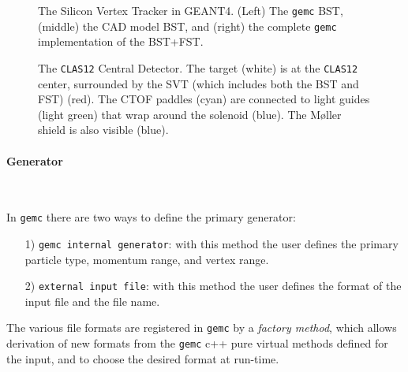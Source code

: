 \begin{figure}[h]
\begin{center}
\caption{\small{The Silicon Vertex Tracker in GEANT4. (Left) The 
{\tt gemc} BST, (middle) the CAD model BST, and (right) the complete 
{\tt gemc} implementation of the BST+FST.}}
\label{fig:svt}
\end{center}
\end{figure}
\clearpage
\newpage

\begin{figure}[h]
\begin{center}
\caption{\small{The {\tt CLAS12} Central Detector. The target (white) is at 
the {\tt CLAS12} center, surrounded by the SVT (which includes both the
BST and FST) (red).  The CTOF paddles (cyan) are connected to light guides 
(light green) that wrap around the solenoid (blue). The M{\o}ller shield is 
also visible (blue).}}
\label{fig:central}
\end{center}
\end{figure}

\clearpage
\newpage

\paragraph{Generator}

~~

\vskip 0.3cm

In {\tt gemc} there are two ways to define the primary generator:

\begin{itemize}
\item[1)] {\tt gemc internal generator}: with this method the user defines 
the primary particle type, momentum range, and vertex range.
\item[2)] {\tt external input file}: with this method the user defines 
the format of the input file and the file name.
\end{itemize}

The various file formats are registered in {\tt gemc} by a 
{\it factory method}, which allows derivation of new formats from the 
{\tt gemc} c++ pure virtual methods defined for the input, and to choose 
the desired format at run-time.

